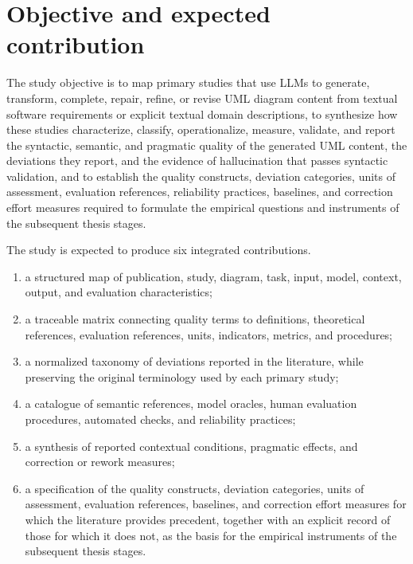 \section{Objective and expected contribution}
\label{sec:protocol_objective}

The study objective is to map primary studies that use LLMs to generate, transform, complete, repair, refine, or revise UML diagram content from textual software requirements or explicit textual domain descriptions, to synthesize how these studies characterize, classify, operationalize, measure, validate, and report the syntactic, semantic, and pragmatic quality of the generated UML content, the deviations they report, and the evidence of hallucination that passes syntactic validation, and to establish the quality constructs, deviation categories, units of assessment, evaluation references, reliability practices, baselines, and correction effort measures required to formulate the empirical questions and instruments of the subsequent thesis stages.

The study is expected to produce six integrated contributions.

\begin{enumerate}[label=\roman*)]
    \item a structured map of publication, study, diagram, task, input, model, context, output, and evaluation characteristics;
    \item a traceable matrix connecting quality terms to definitions, theoretical references, evaluation references, units, indicators, metrics, and procedures;
    \item a normalized taxonomy of deviations reported in the literature, while preserving the original terminology used by each primary study;
    \item a catalogue of semantic references, model oracles, human evaluation procedures, automated checks, and reliability practices;
    \item a synthesis of reported contextual conditions, pragmatic effects, and correction or rework measures;
    \item a specification of the quality constructs, deviation categories, units of assessment, evaluation references, baselines, and correction effort measures for which the literature provides precedent, together with an explicit record of those for which it does not, as the basis for the empirical instruments of the subsequent thesis stages.
\end{enumerate}

